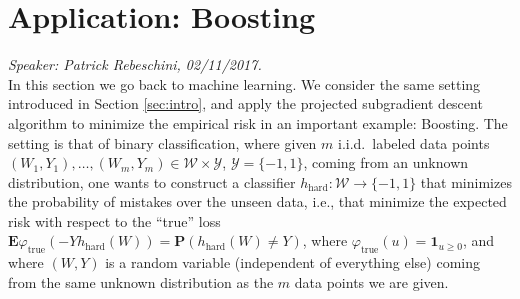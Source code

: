
\section{Application: Boosting}

\emph{Speaker: Patrick Rebeschini, 02/11/2017.}\\

In this section we go back to machine learning. We consider the same setting introduced in Section \ref{sec:intro}, and apply the projected subgradient descent algorithm to minimize the empirical risk in an important example: Boosting. The setting is that of binary classification, where given $m$ i.i.d.\ labeled data points $(W_1,Y_1),\ldots,(W_m,Y_m)\in\mathcal{W}\times\mathcal{Y}$, $\mathcal{Y}=\{-1,1\}$, coming from an unknown distribution, one wants to construct a classifier $h_\text{hard}:\mathcal{W} \rightarrow \{-1,1\}$ that minimizes the probability of mistakes over the unseen data, i.e., that minimize the expected risk with respect to the ``true'' loss $\mathbf{E} \varphi_\text{true}(-Yh_\text{hard}(W))=\mathbf{P} (h_\text{hard}(W)\neq Y)$, where $\varphi_\text{true}(u) = \mathbf{1}_{u\ge 0}$, and where $(W,Y)$ is a random variable (independent of everything else) coming from the same unknown distribution as the $m$ data points we are given.

